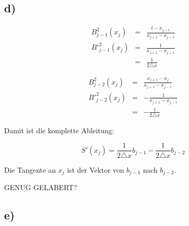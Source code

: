 \subsection*{d)}

\begin{eqnarray}
    B^2_{j-1}(x_j) &=& \frac{t - x_{j-1}}{x_{j+1} - x_{j-1}} \\
    B'^2_{j-1}(x_j)&=& \frac{1}{x_{j+1} - x_{j-1}}\\
    &=& \frac{1}{2 \triangle x}
\end{eqnarray}

\begin{eqnarray}
    B^2_{j-2}(x_j)&=& \frac{x_{j+1} - x_{j}}{x_{j+1} - x_{j-1}}\\
    B'^2_{j-2}(x_j)&=& -\frac{1}{x_{j+1} - x_{j-1}}\\
        &=& -\frac{1}{2 \triangle x}
\end{eqnarray}

Damit ist die komplette Ableitung:

\begin{equation}
    S'(x_j) =  \frac{1}{2 \triangle x} b_{j-1} - \frac{1}{2 \triangle x} b_{j-2}
\end{equation}

Die Tangente an $x_j$ ist der Vektor von $b_{j-1}$ nach $b_{j-2}$.

GENUG GELABERT?


\subsection*{e)}


